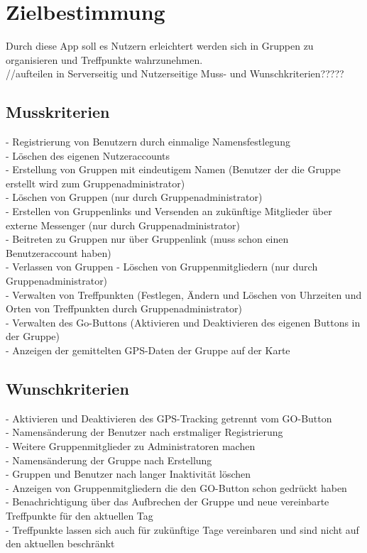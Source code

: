 \section{Zielbestimmung}
Durch diese App soll es Nutzern erleichtert werden sich in Gruppen zu organisieren und Treffpunkte wahrzunehmen.\\
	
//aufteilen in Serverseitig und Nutzerseitige Muss- und Wunschkriterien?????
\subsection{Musskriterien} 
- 	Registrierung von Benutzern durch einmalige Namensfestlegung\\
-	Löschen des eigenen Nutzeraccounts\\
-	Erstellung von Gruppen mit eindeutigem Namen (Benutzer der die Gruppe erstellt wird zum Gruppenadministrator)\\
-	Löschen von Gruppen (nur durch Gruppenadministrator)\\
- 	Erstellen von Gruppenlinks und Versenden an zukünftige Mitglieder über externe Messenger (nur durch Gruppenadministrator)\\
- 	Beitreten zu Gruppen nur über Gruppenlink (muss schon einen Benutzeraccount haben)\\
-	Verlassen von Gruppen
-	Löschen von Gruppenmitgliedern (nur durch Gruppenadministrator)\\
- 	Verwalten von Treffpunkten (Festlegen, Ändern und Löschen von Uhrzeiten und Orten von Treffpunkten durch Gruppenadministrator)\\
- 	Verwalten des Go-Buttons (Aktivieren und Deaktivieren des eigenen Buttons in der Gruppe)\\
-	Anzeigen der gemittelten GPS-Daten der Gruppe auf der Karte \\
	
\subsection{Wunschkriterien}
-	Aktivieren und Deaktivieren des GPS-Tracking getrennt vom GO-Button\\
-	Namensänderung der Benutzer nach erstmaliger Registrierung\\
- 	Weitere Gruppenmitglieder zu Administratoren machen\\
-	Namensänderung der Gruppe nach Erstellung\\
-	Gruppen und Benutzer nach langer Inaktivität löschen\\
- 	Anzeigen von Gruppenmitgliedern die den GO-Button schon gedrückt haben\\
- 	Benachrichtigung über das Aufbrechen der Gruppe und neue vereinbarte Treffpunkte für den aktuellen Tag\\
-	Treffpunkte lassen sich auch für zukünftige Tage vereinbaren und sind nicht auf den aktuellen beschränkt\\
	
